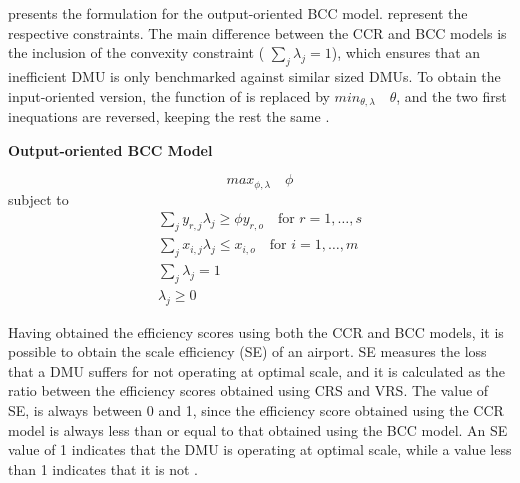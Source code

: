  presents the formulation for the output-oriented BCC model.  represent the respective constraints. The main difference between the CCR and BCC models is the inclusion of the convexity constraint ( \(\sum_j \lambda_j = 1\)), which ensures that an inefficient DMU is only benchmarked against similar sized DMUs.
To obtain the input-oriented version, the function of  is replaced by \(min_{\theta,\lambda} \quad \theta\), and the two first inequations are reversed, keeping the rest the same \cite{banker1984}.

\clearpage
\vspace{-0.4cm}
\begin{center}
\textbf{Output-oriented BCC Model}
\end{center}
\begin{equation}
    \label{output_dea}
max_{\phi,\lambda} \quad \phi
\end{equation}
subject to
\begin{equation}
\label{eq:bcc_constraints_output}
\begin{gathered}
\sum_j y_{r,j} \lambda_j \geq \phi y_{r,o} \quad \text{for } r=1,\ldots,s \\
\sum_j x_{i,j}\lambda_j \leq x_{i,o} \quad \text{for } i=1,\ldots,m \\
\sum_j \lambda_j = 1 \\
\lambda_j \geq 0
\end{gathered}
\end{equation}
\vspace{-0.4cm}


Having obtained the efficiency scores using both the CCR and BCC models,
it is possible to obtain the scale efficiency (SE) of an airport. SE measures the loss that a DMU suffers
for not operating at optimal scale, and it is calculated as the ratio between the efficiency scores obtained
using CRS and VRS.
The value of SE, is always between 0 and 1, since the efficiency score obtained using the CCR model is always less than or equal to that obtained using the BCC model. An SE value of 1 indicates that the DMU is operating at optimal scale, while a value less than 1 indicates that it is not \cite{bogetoft2011}.

